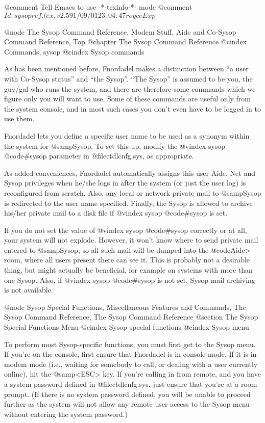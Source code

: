 @comment Tell Emacs to use -*-texinfo-*- mode
@comment $Id: sysopref.tex,v 2.5 91/09/01 23:04:47 royce Exp $

@node The Sysop Command Reference, Modem Stuff, Aide and Co-Sysop Command Reference, Top
@chapter The Sysop Command Reference
@cindex Commands, sysop
@cindex Sysop commands

As has been mentioned before, Fnordadel makes a distinction between
``a user with Co-Sysop status'' and ``the Sysop''.  ``The Sysop'' is
assumed to be you,
the guy/gal who runs the system, and there are therefore some commands which
we figure only you will want to use.  Some of these commands are useful only
from the system console, and in most such cases you don't even have to be logged
in to use them.

Fnordadel lets you define a specific user name to be used as a
synonym within the system for @samp{Sysop}.  To set this up, modify the
@vindex sysop
@code{#sysop} parameter in @file{ctdlcnfg.sys}, as appropriate.

As added conveniences, Fnordadel automatically assigns
this user Aide, Net and Sysop privileges when he/she logs in after the system
(or just the user log) is reconfigured from scratch.  Also, any local or network
private mail to @samp{Sysop} is redirected to the user name specified.  Finally,
the Sysop is allowed to archive his/her private mail to a disk file if
@vindex sysop
@code{#sysop} is set.

If you do not set the value of
@vindex sysop
@code{#sysop} correctly or at all, your system will
not explode.  However, it won't know where to send private mail entered to
@samp{Sysop}, so all such mail will be dumped into the @code{Aide>} room, where all
users present there can see it.  This is probably not a desirable thing, but
might actually be beneficial, for example on systems with more than one Sysop.
Also, if
@vindex sysop
@code{#sysop} is not set, Sysop mail archiving is not available.

@node Sysop Special Functions, Miscellaneous Features and Commands, The Sysop Command Reference, The Sysop Command Reference
@section The Sysop Special Functions Menu
@cindex Sysop special functions
@cindex Sysop menu

To perform most Sysop-specific functions, you must first get to the Sysop menu.
If you're on the console, first ensure that Fnordadel is in console mode.
If it is in modem mode (i.e., waiting for somebody to call, or dealing with a
user currently online), hit the @samp{<ESC>} key.  If you're calling in from remote,
and you have a system password defined in @file{ctdlcnfg.sys}, just ensure that you're
at a room prompt.  (If there is no system password defined, you will be
unable to proceed further as the system will not allow any remote user access
to the Sysop menu without entering the system password.)

